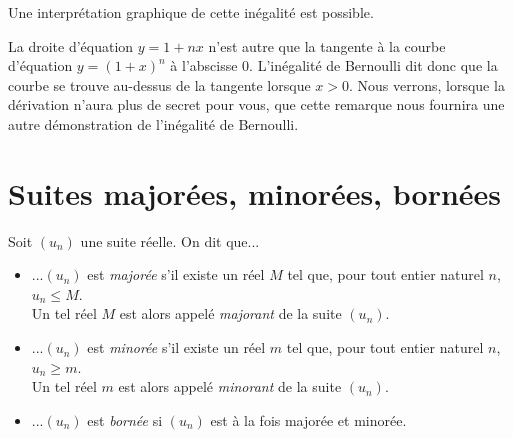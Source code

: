 \documentclass[11pt,fleqn]{book} %
\begin{document}
\begin{minipage}{0.3\linewidth}
\begin{center}
\end{center}\end{minipage}\hfill
\begin{minipage}{0.65\linewidth}
Une interprétation graphique de cette inégalité est possible.

La droite d'équation $y=1+nx$ n'est autre que la tangente à la courbe d'équation $y=(1+x)^n$ à l'abscisse 0. L'inégalité de Bernoulli dit donc que la courbe se trouve au-dessus de la tangente lorsque $x>0$.
\vskip5pt
Nous verrons, lorsque la dérivation n'aura plus de secret pour vous, que cette remarque nous fournira une autre démonstration de l'inégalité de Bernoulli.
\end{minipage}



\section{Suites majorées, minorées, bornées}

\begin{definition} Soit $(u_n)$ une suite réelle. On dit que...
\begin{itemize}
\item ...$(u_n)$ est \textit{majorée} s'il existe un réel $M$ tel que, pour tout entier naturel $n$, $u_n \leqslant M$.\\ Un tel réel $M$ est alors appelé \textit{majorant} de la suite $(u_n)$.
\vskip5pt
\item ...$(u_n)$ est \textit{minorée} s'il existe un réel $m$ tel que, pour tout entier naturel $n$, $u_n \geqslant m$.\\ Un tel réel $m$ est alors appelé \textit{minorant} de la suite $(u_n)$.
\vskip5pt
\item ...$(u_n)$ est \textit{bornée} si $(u_n)$ est à la fois majorée et minorée.
\end{itemize}\end{definition}
\end{document}
